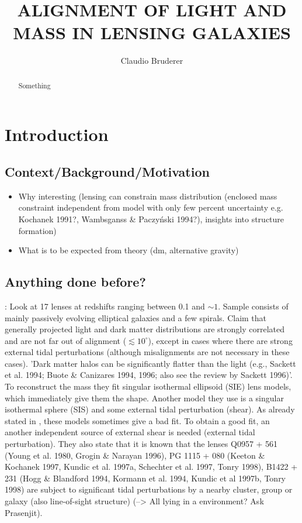\documentclass[10pt]{article}
\title{ALIGNMENT OF LIGHT AND MASS IN LENSING GALAXIES}
\author{Claudio Bruderer}
\begin{document}
\maketitle


\begin{abstract}
\noindent Something
\end{abstract}





\section{Introduction}

\subsection{Context/Background/Motivation}
\begin{itemize}
\item Why interesting (lensing can constrain mass distribution (enclosed mass constraint independent from model with only few percent uncertainty e.g. Kochanek 1991?, Wambsganss \& Paczyński 1994?), insights into structure formation)
\item What is to be expected from theory (dm, alternative gravity)
\end{itemize}


\subsection{Anything done before?}
\textbf{\cite{1997ApJ...482..604K}}: Look at 17 lenses at redshifts ranging between 0.1 and $\sim1$. Sample consists of mainly passively evolving elliptical galaxies and a few spirals. Claim that generally projected light and dark matter distributions are strongly correlated and are not far out of alignment ($\lesssim10^{\circ}$), except in cases where there are strong external tidal perturbations (although misalignments are not necessary in these cases). 'Dark matter halos can be significantly flatter than the light (e.g., Sackett et al. 1994; Buote \& Canizares 1994, 1996; also see the review by Sackett 1996)'. To reconstruct the mass they fit singular isothermal ellipsoid (SIE) lens models, which immediately give them the shape. Another model they use is a singular isothermal sphere (SIS) and some external tidal perturbation (shear). As already stated in \cite{1998ApJ...509..561K}, these models sometimes give a bad fit. To obtain a good fit, an another independent source of external shear is needed (external tidal perturbation). They also state that it is known that the lenses Q0957 + 561 (Young et al. 1980, Grogin \& Narayan 1996), PG 1115 + 080 (Keeton \& Kochanek 1997, Kundic et al. 1997a, Schechter et al. 1997, Tonry 1998), B1422 + 231 (Hogg \& Blandford 1994, Kormann et al. 1994, Kundic et al 1997b, Tonry 1998) are subject to significant tidal perturbations by a nearby cluster, group or galaxy (also line-of-sight structure) (--> All lying in a environment? Ask Prasenjit).
\end{document}
